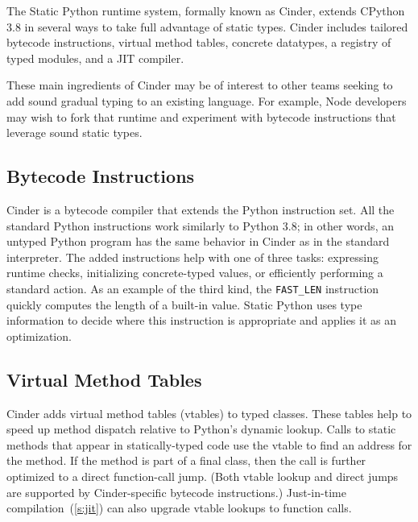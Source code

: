 \documentclass[english,cleveref,submission]{programming}
\newcommand{\SP}{Static Python}
\newcommand{\code}[1]{\texttt{#1}}
\begin{document}

The \SP{} runtime system, formally known as Cinder, extends
CPython 3.8 in several ways to take full advantage of static types.
Cinder includes tailored bytecode instructions, virtual method tables,
concrete datatypes, a registry of typed modules, and a JIT compiler.

These main ingredients of Cinder may be of interest to other teams seeking to
add sound gradual typing to an existing language.
For example, Node developers may wish to fork that runtime and experiment with
bytecode instructions that leverage sound static types.


\subsection{Bytecode Instructions}

Cinder is a bytecode compiler that extends the Python instruction set.
All the standard Python instructions work similarly to Python 3.8;
in other words, an untyped Python program has the same behavior in
Cinder as in the standard interpreter.
The added instructions help with one of three tasks:
expressing runtime checks,
initializing concrete-typed values,
or efficiently performing a standard action.
As an example of the third kind, the \code{FAST\_LEN} instruction quickly
computes the length of a built-in value.
\SP{} uses type information to decide where this instruction is appropriate
and applies it as an optimization.


\subsection{Virtual Method Tables}
\label{s:vtable}

Cinder adds virtual method tables (vtables) to typed classes.
These tables help to speed up method dispatch relative to Python's
dynamic lookup.
Calls to static methods that appear in statically-typed
code use the vtable to find an address for the method.
If the method is part of a final class, then the call is further optimized
to a direct function-call jump.
(Both vtable lookup and direct jumps are supported by Cinder-specific bytecode
instructions.)
Just-in-time compilation~(\cref{s:jit}) can also upgrade vtable lookups to
function calls.
\end{document}
